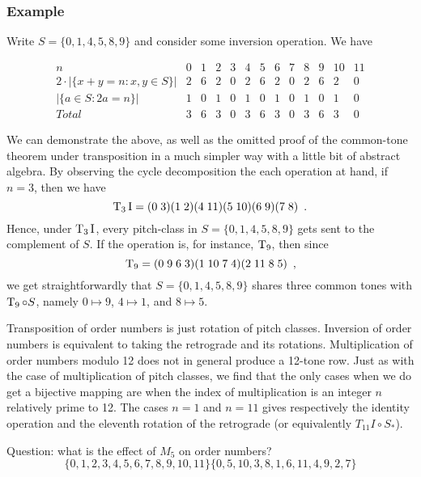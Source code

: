 \subsubsection{Example}

Write $S = \{ 0, 1, 4, 5, 8, 9 \}$ and consider some inversion operation. We have

$$
\begin{array}{ *{13}{c} }
n & 0 & 1 & 2 & 3 & 4 & 5 & 6 & 7 & 8 & 9 & 10 & 11 \\
2 \cdot |\{x + y = n : x, y \in S\}| & 2 & 6 & 2 & 0 & 2 & 6 & 2 & 0 & 2 & 6 & 2 & 0 \\
|\{a \in S : 2a = n\}| & 1 & 0 & 1 & 0 & 1 & 0 & 1 & 0 & 1 & 0 & 1 & 0 \\
Total & 3 & 6 & 3 & 0 & 3 & 6 & 3 & 0 & 3 & 6 & 3 & 0
\end{array}
$$

We can demonstrate the above, as well as the omitted proof of the common-tone theorem under transposition in a much simpler way with a little bit of abstract algebra. By observing the cycle decomposition the each operation at hand, if $n = 3$, then we have
$$
\operatorname{T}_3\operatorname{I} = (0 \; 3) (1 \; 2) (4 \; 11) (5 \; 10) (6 \; 9) (7 \; 8) \enspace.
$$
Hence, under $\operatorname{T}_3\operatorname{I}$, every pitch-class in $S = \{ 0, 1, 4, 5, 8, 9 \}$ gets sent to the complement of $S$. If the operation is, for instance, $\operatorname{T}_9$, then since
$$
\operatorname{T}_9 = (0 \; 9 \; 6 \; 3) (1 \; 10 \; 7 \; 4) (2 \; 11 \; 8 \; 5) \enspace,
$$
we get straightforwardly that $S = \{ 0, 1, 4, 5, 8, 9 \}$ shares three common tones with $\operatorname{T}_9 \circ S$, namely $0 \mapsto 9$, $4 \mapsto 1$, and $8 \mapsto 5$.


Transposition of order numbers is just rotation of pitch classes. Inversion of order numbers is equivalent to taking the retrograde and its rotations. Multiplication of order numbers modulo 12 does not in general produce a 12-tone row. Just as with the case of multiplication of pitch classes, we find that the only cases when we do get a bijective mapping are when the index of multiplication is an integer $n$ relatively prime to 12. The cases $n = 1$ and $n = 11$ gives respectively the identity operation and the eleventh rotation of the retrograde (or equivalently $T_{11}I \circ S_*$).

Question: what is the effect of $M_5$ on order numbers?
$$
\{ 0, 1, 2, 3, 4, 5, 6, 7, 8, 9, 10, 11 \}
\{ 0, 5, 10, 3, 8, 1, 6, 11, 4, 9, 2, 7 \}
$$

